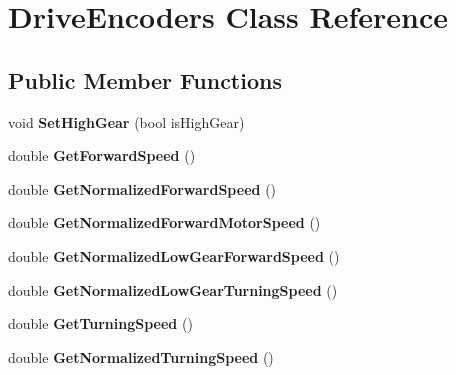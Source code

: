 \hypertarget{class_drive_encoders}{
\section{\-Drive\-Encoders \-Class \-Reference}
\label{class_drive_encoders}
}
\subsection*{\-Public \-Member \-Functions}
\begin{DoxyCompactItemize}
\item 
\hypertarget{class_drive_encoders_ae37e8c37d4fc8f311436df67397501bf}{
void {\bfseries \-Set\-High\-Gear} (bool is\-High\-Gear)}
\label{class_drive_encoders_ae37e8c37d4fc8f311436df67397501bf}

\item 
\hypertarget{class_drive_encoders_afd9195bc7d18ec787988eb98fb5c9e3f}{
double {\bfseries \-Get\-Forward\-Speed} ()}
\label{class_drive_encoders_afd9195bc7d18ec787988eb98fb5c9e3f}

\item 
\hypertarget{class_drive_encoders_ab347d16a7104639d6c5b1a8935e8f001}{
double {\bfseries \-Get\-Normalized\-Forward\-Speed} ()}
\label{class_drive_encoders_ab347d16a7104639d6c5b1a8935e8f001}

\item 
\hypertarget{class_drive_encoders_af812002a6c534bbdc319975d38aa34f8}{
double {\bfseries \-Get\-Normalized\-Forward\-Motor\-Speed} ()}
\label{class_drive_encoders_af812002a6c534bbdc319975d38aa34f8}

\item 
\hypertarget{class_drive_encoders_ac7b40d76ab67f792738728691c5c1773}{
double {\bfseries \-Get\-Normalized\-Low\-Gear\-Forward\-Speed} ()}
\label{class_drive_encoders_ac7b40d76ab67f792738728691c5c1773}

\item 
\hypertarget{class_drive_encoders_a32f392d2bae9f9f31129653decc63ce4}{
double {\bfseries \-Get\-Normalized\-Low\-Gear\-Turning\-Speed} ()}
\label{class_drive_encoders_a32f392d2bae9f9f31129653decc63ce4}

\item 
\hypertarget{class_drive_encoders_a1e03415c6447a9d9787798ed1b68b92f}{
double {\bfseries \-Get\-Turning\-Speed} ()}
\label{class_drive_encoders_a1e03415c6447a9d9787798ed1b68b92f}

\item 
\hypertarget{class_drive_encoders_a469555dd7fa99affb43268c301b27d8e}{
double {\bfseries \-Get\-Normalized\-Turning\-Speed} ()}
\label{class_drive_encoders_a469555dd7fa99affb43268c301b27d8e}


\end{DoxyCompactItemize}
